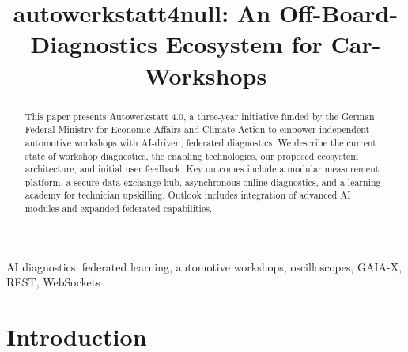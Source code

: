 




\title{autowerkstatt4null: An Off-Board-Diagnostics Ecosystem for Car-Workshops}
\author{%
}

\maketitle

\begin{abstract}
This paper presents Autowerkstatt 4.0, a three-year initiative funded by the German Federal Ministry for Economic Affairs and Climate Action to empower independent automotive workshops with AI-driven, federated diagnostics. We describe the current state of workshop diagnostics, the enabling technologies, our proposed ecosystem architecture, and initial user feedback. Key outcomes include a modular measurement platform, a secure data-exchange hub, asynchronous online diagnostics, and a learning academy for technician upskilling. Outlook includes integration of advanced AI modules and expanded federated capabilities.
\end{abstract}

\begin{IEEEkeywords}
AI diagnostics, federated learning, automotive workshops, oscilloscopes, GAIA-X, REST, WebSockets
\end{IEEEkeywords}

\section{Introduction}
